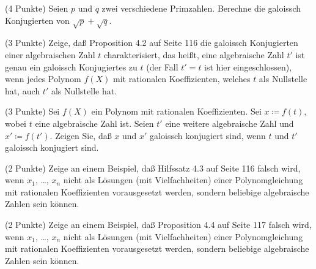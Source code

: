 \documentclass{algsheet}
\begin{document}
\begin{exercise}(4 Punkte)\newline
    Seien \(p\) und \(q\) zwei verschiedene Primzahlen. Berechne die galoissch Konjugierten von
    \(\sqrt p + \sqrt q\).
\end{exercise}

\begin{exercise}(3 Punkte)\newline
    Zeige, daß Proposition 4.2 auf Seite 116 die galoissch Konjugierten einer algebraischen
    Zahl \(t\) charakterisiert, das heißt, eine algebraische Zahl \(t'\) ist genau ein
    galoissch Konjugiertes zu \(t\) (der Fall \(t' = t\) ist hier eingeschlossen), wenn
    jedes Polynom \(f(X)\) mit rationalen Koeffizienten, welches \(t\) als Nullstelle hat,
    auch \(t'\) als Nullstelle hat.
\end{exercise}  

\begin{exercise}(3 Punkte)\newline
    Sei \(f(X)\) ein Polynom mit rationalen Koeffizienten. Sei \(x \coloneqq f(t)\), wobei
    \(t\) eine algebraische Zahl ist. Seien \(t'\) eine weitere algebraische Zahl und
    \(x' \coloneqq f(t')\). Zeigen Sie, daß \(x\) und \(x'\) galoissch konjugiert sind,
    wenn \(t\) und \(t'\) galoissch konjugiert sind.
\end{exercise}

\begin{exercise}(2 Punkte)\newline
    Zeige an einem Beispiel, daß Hilfssatz 4.3 auf Seite 116 falsch wird, wenn \(x_1\), \dots,
    \(x_n\) nicht als Lösungen (mit Vielfachheiten) einer Polynomgleichung mit rationalen
    Koeffizienten vorausgesetzt werden, sondern beliebige algebraische Zahlen sein können.
\end{exercise}


\begin{exercise}(2 Punkte)\newline
    Zeige an einem Beispiel, daß Proposition 4.4 auf Seite 117 falsch wird, wenn \(x_1\), \dots,
    \(x_n\) nicht als Lösungen (mit Vielfachheiten) einer Polynomgleichung mit rationalen
    Koeffizienten vorausgesetzt werden, sondern beliebige algebraische Zahlen sein können.
\end{exercise}
\end{document}
